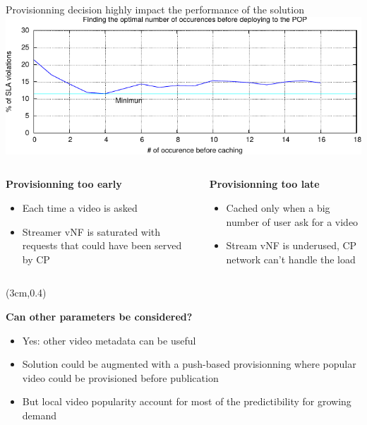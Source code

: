 \documentclass[a4paper]{beamer}
\begin{document}
\begin{frame}{Provisionning decision highly impact the performance of the solution}
	\includegraphics[width=0.90\linewidth]{cachingStrat_evaluation.pdf}
		\begin{columns}[T]
		\begin{column}[T]{0.5 \textwidth} 
		
		\textbf{Provisionning too early}
			\begin{itemize}
				\item Each time a video is asked
				\item Streamer vNF is saturated with requests that could have been served by CP
			\end{itemize}
		\end{column}
										
		\begin{column}[T]{0.5\textwidth} 
										  
			\textbf{Provisionning too late}
			\begin{itemize}
				\item Cached only when a big number of user ask for a video
				\item Stream vNF is underused, CP network can't handle the load
			\end{itemize}
			
		\end{column}
																										
	\end{columns}
	
		\begin{textblock*}{8cm}(3cm,0.4\textheight)
		\begin{alertblock}{}
			\textbf{ Can other parameters be considered? }
			\begin{itemize}
				\item Yes: other video metadata can be useful
				\item Solution could be augmented with a push-based provisionning where popular video could be provisioned before publication
				\item But local video popularity account for most of the predictibility for growing demand
			\end{itemize}
		\end{alertblock}
	\end{textblock*}		
	
\end{frame}
\end{document}
